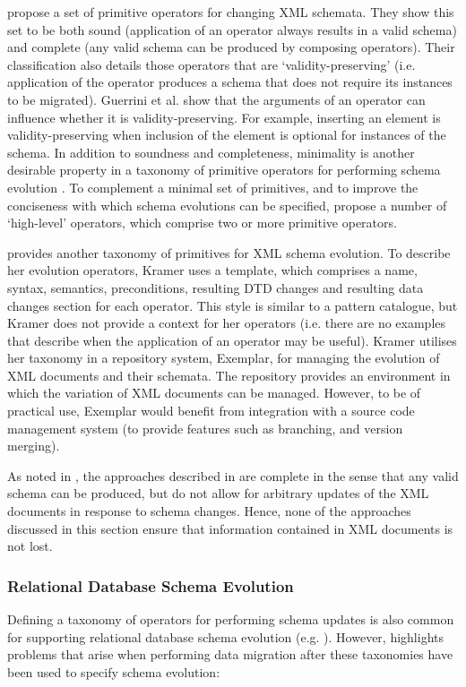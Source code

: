 \cite{guerrini05impact} propose a set of primitive operators for changing XML schemata. They show this set to be both sound (application of an operator always results in a valid schema) and complete (any valid schema can be produced by composing operators). Their classification also details those operators that are `validity-preserving' (i.e. application of the operator produces a schema that does not require its instances to be migrated). Guerrini et al. show that the arguments of an operator can influence whether it is validity-preserving. For example, inserting an element is validity-preserving when inclusion of the element is optional for instances of the schema. In addition to soundness and completeness, minimality is another desirable property in a taxonomy of primitive operators for performing schema evolution \cite{su01xem}. To complement a minimal set of primitives, and to improve the conciseness with which schema evolutions can be specified, \cite{guerrini05impact} propose a number of `high-level' operators, which comprise two or more primitive operators.

\cite{kramer01xem} provides another taxonomy of primitives for XML schema evolution. To describe her evolution operators, Kramer uses a template, which comprises a name, syntax, semantics, preconditions, resulting DTD changes and resulting data changes section for each operator. This style is similar to a pattern catalogue, but Kramer does not provide a context for her operators (i.e. there are no examples that describe when the application of an operator may be useful). Kramer utilises her taxonomy in a repository system, Exemplar, for managing the evolution of XML documents and their schemata. The repository provides an environment in which the variation of XML documents can be managed. However, to be of practical use, Exemplar would benefit from integration with a source code management system (to provide features such as branching, and version merging).

As noted in \cite{pizka07automating}, the approaches described in \cite{kramer01xem,su01xem,guerrini05impact} are complete in the sense that any valid schema can be produced, but do not allow for arbitrary updates of the XML documents in response to schema changes. Hence, none of the approaches discussed in this section ensure that information contained in XML documents is not lost.


\subsubsection{Relational Database Schema Evolution}
\label{LitReview:RdbsSchemaEvo}
Defining a taxonomy of operators for performing schema updates is also common for supporting relational database schema evolution (e.g. \cite{edelweiss05temporal,banerjee87semantics}). However, \cite{lerner00model} highlights problems that arise when performing data migration after these taxonomies have been used to specify schema evolution:

